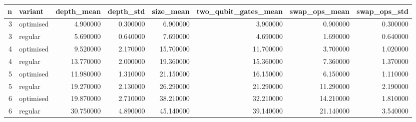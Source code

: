 \begin{tabular}{rlrrrrrr}
\toprule
n & variant & depth_mean & depth_std & size_mean & two_qubit_gates_mean & swap_ops_mean & swap_ops_std \\
\midrule
3 & optimised & 4.900000 & 0.300000 & 6.900000 & 3.900000 & 0.900000 & 0.300000 \\
3 & regular & 5.690000 & 0.640000 & 7.690000 & 4.690000 & 1.690000 & 0.640000 \\
4 & optimised & 9.520000 & 2.170000 & 15.700000 & 11.700000 & 3.700000 & 1.020000 \\
4 & regular & 13.770000 & 2.000000 & 19.360000 & 15.360000 & 7.360000 & 1.370000 \\
5 & optimised & 11.980000 & 1.310000 & 21.150000 & 16.150000 & 6.150000 & 1.110000 \\
5 & regular & 19.270000 & 2.130000 & 26.290000 & 21.290000 & 11.290000 & 2.190000 \\
6 & optimised & 19.870000 & 2.710000 & 38.210000 & 32.210000 & 14.210000 & 1.810000 \\
6 & regular & 30.750000 & 4.890000 & 45.140000 & 39.140000 & 21.140000 & 3.540000 \\
\bottomrule
\end{tabular}
